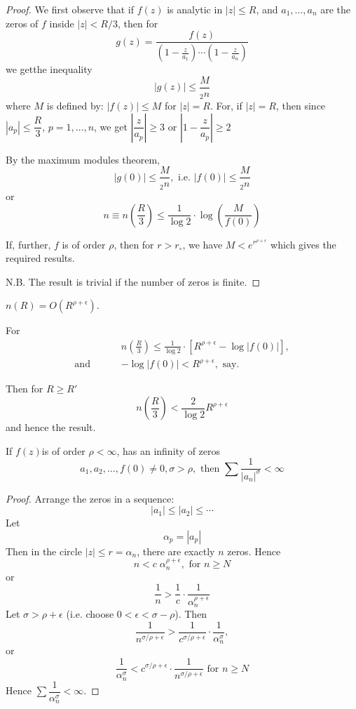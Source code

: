 \begin{proof}
We first observe that if $f(z)$ is analytic in $|z| \leq R$, and $a_1,
\ldots, a_n$ are the zeros of $f$ inside $|z| < R/3$, then for 
$$
g(z)  = \frac{f(z)}{\left(1-\frac{z}{a_1}\right) \cdots
  \left(1-\frac{z}{a_n} \right)} 
$$
we get\pageoriginale the inequality
$$
|g(z)| \leq \frac{M}{{}_2 n}
$$
where $M$ is defined by: $|f(z)| \leq M$ for $|z| = R$.
For, if $|z| = R$, then since $|a_p| \leq \dfrac{R}{3}$, $p = 1, \ldots,
n$, we get $\left|\dfrac{z}{a_p} \right| \geq 3$ or
$\left|1-\dfrac{z}{a_p} \right| \geq 2$ 

By the maximum modules theorem,
$$
|g(0)| \leq \frac{M}{{}_2 n} , \text{ i.e. } |f(0)| \leq \frac{M}{{}_2
n}
$$
or  
$$
n \equiv n \left(\frac{R}{3} \right) \leq \frac{1}{\log2 } \cdot \log
\left( \frac{M}{f(0)}\right) 
$$

If, further, $f$ is of order $\rho$, then for $r > r_\circ$, we have $M <
e^{r^{\rho+\epsilon}}$ which gives the required results.

N.B. The result is trivial if the number of zeros is finite.
\end{proof}

\begin{coro*}
$
n(R ) = O (R^{\rho + \epsilon})$. 

For 
\begin{align*}
& n \left(\frac{R}{3} \right) \leq \frac{1}{\log 2} \cdot \left[R^{\rho
    + \epsilon} - \log |f(0)| \right],\\
\text{and } \qquad & -\log |f(0)| < R^{\rho + \epsilon}, \text{ say}.
\end{align*}

Then for $R \geq R'$
$$
n \left(\frac{R}{3} \right) < \frac{2}{\log 2} R^{\rho +
  \epsilon} 
$$
and hence the result.
\end{coro*}

\begin{thm}\label{chap4:thm3} 
If $f(z)$\pageoriginale is of order $\rho < \infty$, has an infinity
of zeros 
$$ 
a_1, a_2, \ldots , f(0) \neq 0, \sigma > \rho, \text{ then } \sum
\frac{1}{|a_n|^\sigma} < \infty  
$$
\end{thm}

\begin{proof}
Arrange the zeros in a sequence:
$$
|a_1| \leq |a_2| \leq \cdots
$$
Let
$$
\alpha_p = |a_p|
$$
Then in the circle $|z| \leq r = \alpha_n$, there are exactly $n$
zeros. Hence
$$
n < c \; \alpha^{\rho + \epsilon}_n, \text{ for } n  \geq N
$$
or
$$
\frac{1}{n} > \frac{1}{c} \cdot \frac{1}{\alpha^{\rho + 
    \epsilon}_n}  
$$
Let $\sigma > \rho + \epsilon$ (i.e. choose $0< \epsilon <
\sigma - \rho$). Then
$$
\frac{1}{n^{\sigma/\rho+ \epsilon}} >
\frac{1}{c^{\sigma/\rho+\epsilon}} \cdot
\frac{1}{\alpha^{\sigma}_n}, 
$$ 
or 
$$
\frac{1}{\alpha^{\sigma}_n} < c^{\sigma/\rho+\epsilon} \cdot
\frac{1}{n^{\sigma/\rho+\epsilon}} \text{ for } n \geq N
$$
Hence $ \sum\dfrac{1}{\alpha^\sigma_n} < \infty$.
\end{proof}

